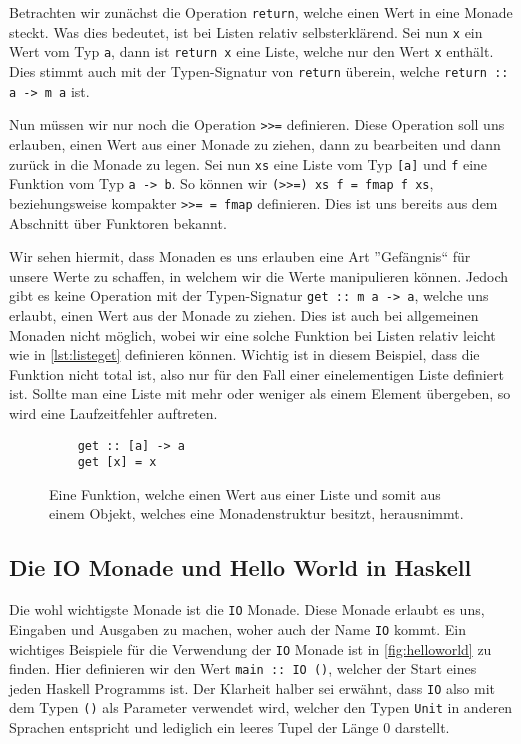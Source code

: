 \documentclass{hhuarticle}
\theoremstyle{definition}
\theoremstyle{theorem}
\begin{document}
  Betrachten wir zunächst die Operation \verb|return|, welche einen
  Wert in eine Monade steckt. Was dies bedeutet, ist bei Listen relativ
  selbsterklärend. Sei nun \verb|x| ein Wert vom Typ \verb|a|, dann
  ist \verb|return x| eine Liste, welche nur den Wert \verb|x| enthält.
  Dies stimmt auch mit der Typen-Signatur von \verb|return| überein,
  welche \verb|return :: a -> m a| ist.

  Nun müssen wir nur noch die Operation \verb|>>=| definieren. Diese
  Operation soll uns erlauben, einen Wert aus einer Monade zu ziehen,
  dann zu bearbeiten und dann zurück in die Monade zu legen.
  Sei nun \verb|xs| eine Liste vom Typ \verb|[a]| und \verb|f| eine
  Funktion vom Typ \verb|a -> b|. So können wir \verb|(>>=) xs f = fmap f xs|,
  beziehungsweise kompakter \verb|>>= = fmap| definieren. Dies ist
  uns bereits aus dem Abschnitt über Funktoren bekannt.

  Wir sehen hiermit, dass Monaden es uns erlauben eine Art ''Gefängnis``
  für unsere Werte zu schaffen, in welchem wir die Werte manipulieren
  können. Jedoch gibt es keine Operation mit der Typen-Signatur
  \verb|get :: m a -> a|, welche uns erlaubt, einen Wert aus der
  Monade zu ziehen. Dies ist auch bei allgemeinen Monaden nicht möglich,
  wobei wir eine solche Funktion bei Listen relativ leicht wie in
  \cref{lst:listeget} definieren können. Wichtig ist in diesem Beispiel,
  dass die Funktion nicht total ist, also nur für den Fall einer einelementigen
  Liste definiert ist. Sollte man eine Liste mit mehr oder weniger als
  einem Element übergeben, so wird eine Laufzeitfehler auftreten.

  \begin{figure}[h]
    \begin{verbatim}
    get :: [a] -> a
    get [x] = x
    \end{verbatim}
    \caption{Eine Funktion, welche einen Wert aus einer Liste und somit aus einem Objekt, welches eine Monadenstruktur besitzt, herausnimmt.}%
    \label{fig:listget}
  \end{figure}

  \subsection{Die IO Monade und Hello World in Haskell}

  Die wohl wichtigste Monade ist die \verb|IO| Monade. Diese Monade
  erlaubt es uns, Eingaben und Ausgaben zu machen, woher auch der
  Name \verb|IO| kommt. Ein wichtiges Beispiele für die Verwendung der
  \verb|IO| Monade ist in \cref{fig:helloworld} zu finden. Hier definieren
  wir den Wert \verb|main :: IO ()|, welcher der Start eines jeden
  Haskell Programms ist. Der Klarheit halber sei erwähnt, dass \verb|IO|
  also mit dem Typen \verb|()| als Parameter verwendet wird, welcher
  den Typen \verb|Unit| in anderen Sprachen entspricht und lediglich
  ein leeres Tupel der Länge 0 darstellt.
\end{document}
